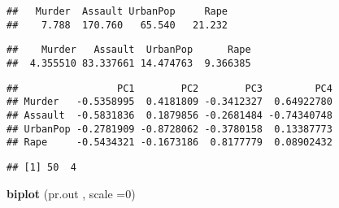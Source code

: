 \documentclass[]{article}
\newenvironment{Shaded}{\begin{snugshade}}{\end{snugshade}}
\newcommand{\DataTypeTok}[1]{\textcolor[rgb]{0.13,0.29,0.53}{#1}}
\newcommand{\DecValTok}[1]{\textcolor[rgb]{0.00,0.00,0.81}{#1}}
\newcommand{\KeywordTok}[1]{\textcolor[rgb]{0.13,0.29,0.53}{\textbf{#1}}}
\newcommand{\NormalTok}[1]{#1}
\newcommand{\OperatorTok}[1]{\textcolor[rgb]{0.81,0.36,0.00}{\textbf{#1}}}
\begin{document}
\begin{Shaded}
\end{Shaded}

\begin{verbatim}
##   Murder  Assault UrbanPop     Rape 
##    7.788  170.760   65.540   21.232
\end{verbatim}

\begin{Shaded}
\end{Shaded}

\begin{verbatim}
##    Murder   Assault  UrbanPop      Rape 
##  4.355510 83.337661 14.474763  9.366385
\end{verbatim}

\begin{Shaded}
\end{Shaded}

\begin{verbatim}
##                 PC1        PC2        PC3         PC4
## Murder   -0.5358995  0.4181809 -0.3412327  0.64922780
## Assault  -0.5831836  0.1879856 -0.2681484 -0.74340748
## UrbanPop -0.2781909 -0.8728062 -0.3780158  0.13387773
## Rape     -0.5434321 -0.1673186  0.8177779  0.08902432
\end{verbatim}

\begin{Shaded}
\end{Shaded}

\begin{verbatim}
## [1] 50  4
\end{verbatim}

\begin{Shaded}
\begin{Highlighting}[]
\KeywordTok{biplot}\NormalTok{ (pr.out , }\DataTypeTok{scale =}\DecValTok{0}\NormalTok{)}
\end{Highlighting}
\end{Shaded}
\end{document}
